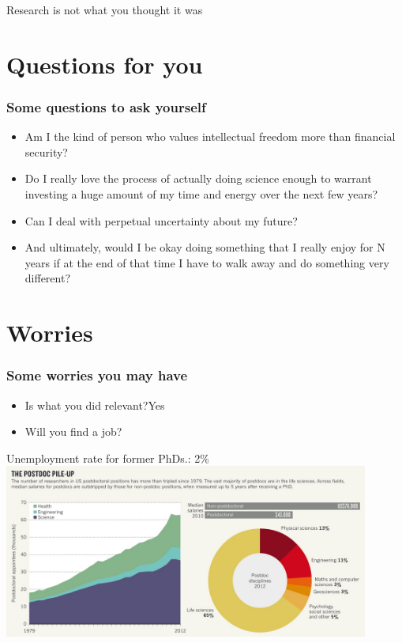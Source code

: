 \documentclass[]{beamer}
\begin{document}
\begin{frame}
\centering
Research is not what you thought it was
\end{frame}

\section[Questions]{Questions for you}
\begin{frame}
\frametitle{Some questions to ask yourself}
\begin{itemize}
\item Am I the kind of person who values intellectual freedom more than financial security? \pause
\item Do I really love the process of actually doing science enough to warrant investing a huge amount of my time and energy over the next few years? \pause
\item Can I deal with perpetual uncertainty about my future? \pause
\item And ultimately, would I be okay doing something that I really enjoy for N years if at the end of that time I have to walk away and do something very different?
\end{itemize}
\end{frame}

\section{Worries}
\begin{frame}
\frametitle{Some worries you may have}
\begin{itemize}
\item Is what you did relevant?\pause \quad \alert{Yes} \pause
\item Will you find a job?
\end{itemize}
\end{frame}

\begin{frame}
Unemployment rate for former PhDs.: 2\%
\centering
\includegraphics[width=0.9\textwidth]{Postdoc2}
\end{frame}
\end{document}
